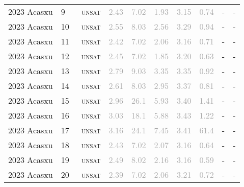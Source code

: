 \begin{center}
{\begin{longtable}{@{}llllllllll@{}}
2023 Acasxu & 9 & ~\textsc{unsat} & \textcolor{darkgray}{2.43} & \textcolor{darkgray}{7.02} & \textcolor{darkgray}{1.93} & \textcolor{darkgray}{3.15} & \textcolor{darkgray}{0.74} & - & - \\
2023 Acasxu & 10 & ~\textsc{unsat} & \textcolor{darkgray}{2.55} & \textcolor{darkgray}{8.03} & \textcolor{darkgray}{2.56} & \textcolor{darkgray}{3.29} & \textcolor{darkgray}{0.94} & - & - \\
2023 Acasxu & 11 & ~\textsc{unsat} & \textcolor{darkgray}{2.42} & \textcolor{darkgray}{7.02} & \textcolor{darkgray}{2.06} & \textcolor{darkgray}{3.16} & \textcolor{darkgray}{0.71} & - & - \\
2023 Acasxu & 12 & ~\textsc{unsat} & \textcolor{darkgray}{2.45} & \textcolor{darkgray}{7.02} & \textcolor{darkgray}{1.85} & \textcolor{darkgray}{3.20} & \textcolor{darkgray}{0.63} & - & - \\
2023 Acasxu & 13 & ~\textsc{unsat} & \textcolor{darkgray}{2.79} & \textcolor{darkgray}{9.03} & \textcolor{darkgray}{3.35} & \textcolor{darkgray}{3.35} & \textcolor{darkgray}{0.92} & - & - \\
2023 Acasxu & 14 & ~\textsc{unsat} & \textcolor{darkgray}{2.61} & \textcolor{darkgray}{8.03} & \textcolor{darkgray}{2.95} & \textcolor{darkgray}{3.37} & \textcolor{darkgray}{0.81} & - & - \\
2023 Acasxu & 15 & ~\textsc{unsat} & \textcolor{darkgray}{2.96} & \textcolor{darkgray}{26.1} & \textcolor{darkgray}{5.93} & \textcolor{darkgray}{3.40} & \textcolor{darkgray}{1.41} & - & - \\
2023 Acasxu & 16 & ~\textsc{unsat} & \textcolor{darkgray}{3.03} & \textcolor{darkgray}{18.1} & \textcolor{darkgray}{5.88} & \textcolor{darkgray}{3.43} & \textcolor{darkgray}{1.22} & - & - \\
2023 Acasxu & 17 & ~\textsc{unsat} & \textcolor{darkgray}{3.16} & \textcolor{darkgray}{24.1} & \textcolor{darkgray}{7.45} & \textcolor{darkgray}{3.41} & \textcolor{darkgray}{61.4} & - & - \\
2023 Acasxu & 18 & ~\textsc{unsat} & \textcolor{darkgray}{2.43} & \textcolor{darkgray}{7.02} & \textcolor{darkgray}{2.07} & \textcolor{darkgray}{3.16} & \textcolor{darkgray}{0.64} & - & - \\
2023 Acasxu & 19 & ~\textsc{unsat} & \textcolor{darkgray}{2.49} & \textcolor{darkgray}{8.02} & \textcolor{darkgray}{2.16} & \textcolor{darkgray}{3.16} & \textcolor{darkgray}{0.59} & - & - \\
2023 Acasxu & 20 & ~\textsc{unsat} & \textcolor{darkgray}{2.39} & \textcolor{darkgray}{7.02} & \textcolor{darkgray}{2.06} & \textcolor{darkgray}{3.21} & \textcolor{darkgray}{0.72} & - & - \\

\end{longtable}}
\end{center}
